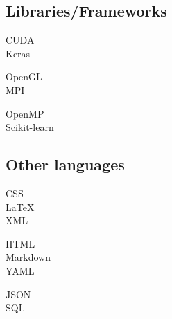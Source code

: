 \documentclass[curriculum-vitae-eng]{subfiles}
\begin{document}
		\subsection*{Libraries/Frameworks}
			\begin{minipage}[t]{.3\textwidth}
				CUDA \hfill {}\\
				Keras \hfill {}\\  %
			\end{minipage}
			\hfill
			\begin{minipage}[t]{.3\textwidth}
				OpenGL \hfill {}\\
				MPI \hfill {}\\  %
			\end{minipage}
			\hfill
			\begin{minipage}[t]{.3\textwidth}
				OpenMP \hfill {}\\
				Scikit-learn \hfill {}\\  %
			\end{minipage}
		
		\subsection*{Other languages}
			\begin{minipage}[t]{.3\textwidth}
				CSS \hfill {}\\
				\LaTeX \hfill {}\\
				XML \hfill {}\\ %
			\end{minipage}
			\hfill
			\begin{minipage}[t]{.3\textwidth}
				HTML \hfill {}\\
				Markdown \hfill {}\\
				YAML \hfill {}\\ %
			\end{minipage}
			\hfill
			\begin{minipage}[t]{.3\textwidth}
				JSON \hfill {}\\
				SQL \hfill {}\\ %
			\end{minipage}
		
\end{document}
